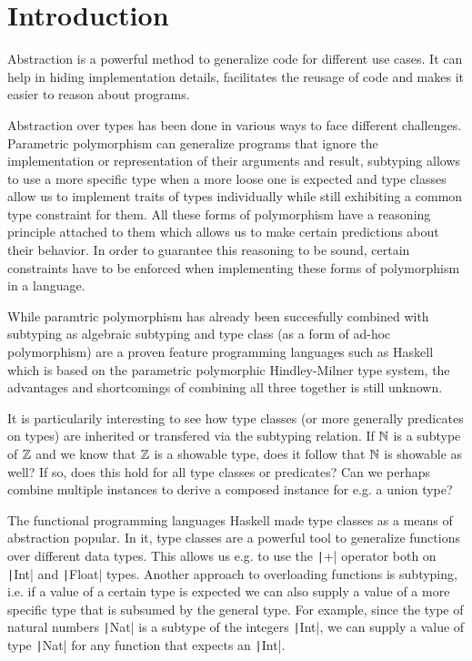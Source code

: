 
\chapter{Introduction}\label{ch:intro}

Abstraction is a powerful method to generalize code for different use cases.
It can help in hiding implementation details, facilitates the reusage of code and makes it easier to reason about programs.

Abstraction over types has been done in various ways to face different challenges.
Parametric polymorphism can generalize programs that ignore the implementation or representation of their arguments and result,
subtyping allows to use a more specific type when a more loose one is expected
and type classes allow us to implement traits of types individually while still exhibiting a common type constraint for them.
All these forms of polymorphism have a reasoning principle attached to them which allows us to make certain predictions about their behavior.
In order to guarantee this reasoning to be sound, certain constraints have to be enforced when implementing these forms of polymorphism in a language.

While paramtric polymorphism has already been succesfully combined with subtyping as algebraic subtyping \cite{dolan2017subtyping}
and type class (as a form of ad-hoc polymorphism) are a proven feature programming languages such as Haskell \cite{wadlerblott} which is based on the parametric polymorphic Hindley-Milner type system,
the advantages and shortcomings of combining all three together is still unknown.

It is particularily interesting to see how type classes (or more generally predicates on types) are inherited or transfered via the subtyping relation.
If $\mathbb{N}$ is a subtype of $\mathbb{Z}$ and we know that $\mathbb{Z}$ is a showable type, does it follow that $\mathbb{N}$ is showable as well?
If so, does this hold for all type classes or predicates?
Can we perhaps combine multiple instances to derive a composed instance for e.g. a union type?

The functional programming languages Haskell made type classes as a means of abstraction popular.
In it, type classes are a powerful tool to generalize functions over different data types.
This allows us e.g. to use the \texttt|+| operator both on \texttt|Int| and \texttt|Float| types.
Another approach to overloading functions is subtyping, i.e. if a value of a certain type is expected we can also supply a value of a more specific type that is subsumed by the general type.
For example, since the type of natural numbers \texttt|Nat| is a subtype of the integers \texttt|Int|, we can supply a value of type \texttt|Nat| for any function that expects an \texttt|Int|.

